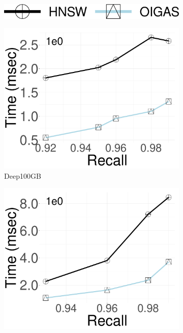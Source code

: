 \begin{figure}[ht]
    \centering
    \captionsetup{justification=centering}
	\centering

		\captionsetup{justification=centering}
		\captionsetup[subfigure]{justification=centering}
        \begin{subfigure}[b]{\textwidth}
        \centering
 		\includegraphics[width=0.3\columnwidth]{../img/oigas/Search/legend.png}
    \end{subfigure}
    
            \begin{subfigure}[b]{0.3\textwidth}
            \centering
                \includegraphics[width=\textwidth]{../img/oigas/Search/FINAL100GB/deep/Time.pdf}
                \caption{Deep100GB}
        \label{fig:oigas:search:100:Deep}
    \end{subfigure}
    \hspace{0.4cm}
            \begin{subfigure}[b]{0.3\textwidth}
            \centering
                \includegraphics[width=\textwidth]{../img/oigas/Search/FINAL1B/deep/Time.pdf}

\end{subfigure}
\end{figure}
